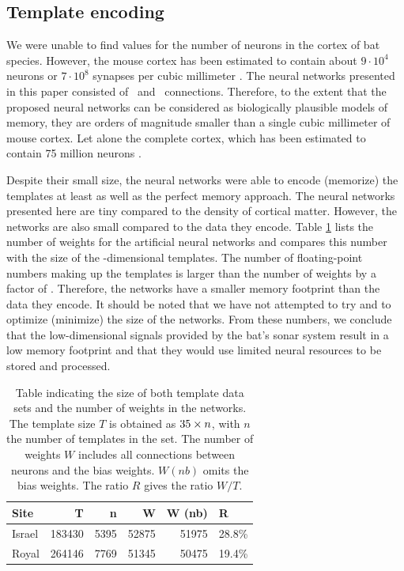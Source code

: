 \documentclass[preprint,5p]{elsarticle}
\begin{document}
\subsection{Template encoding}

We were unable to find values for the number of neurons in the cortex of bat species. However, the mouse cortex has been estimated to contain about $9 \cdot 10^4$ neurons or $7 \cdot 10^8$ synapses per cubic millimeter \citep{Braitenberg2013}. The neural networks presented in this paper consisted of \nneurons\ and \nweights\ connections. Therefore, to the extent that the proposed neural networks can be considered as biologically plausible models of memory, they are orders of magnitude smaller than a single cubic millimeter of mouse cortex. Let alone the complete cortex, which has been estimated to contain 75 million neurons \citep{Williams2000}. 

Despite their small size, the neural networks were able to encode (memorize) the templates at least as well as the perfect memory approach. The neural networks presented here are tiny compared to the density of cortical matter. However, the networks are also small compared to the data they encode. Table \ref{tab:sizes} lists the number of weights for the artificial neural networks and compares this number with the size of the \pca-dimensional templates. The number of floating-point numbers making up the templates is larger than the number of weights by a factor of \Compression. Therefore, the networks have a smaller memory footprint than the data they encode. It should be noted that we have not attempted to try and to optimize (minimize) the size of the networks. From these numbers, we conclude that the low-dimensional signals provided by the bat's sonar system result in a low memory footprint and that they would use limited neural resources to be stored and processed.

\begin{table}
	\centering
	\begin{tabular}{lrrrrl}
		\toprule
		Site &       T &     n &      W &  W (nb) &      R \\
		\midrule
		Israel &  183430 &  5395 &  52875 &   51975 &  28.8\% \\
		Royal &  264146 &  7769 &  51345 &   50475 &  19.4\% \\
		\bottomrule
	\end{tabular}
	\label{tab:sizes}
	\caption{Table indicating the size of both template data sets and the number of weights in the networks. The template size $T$ is obtained as $35 \times n$, with $n$ the number of templates in the set. The number of weights $W$ includes all connections between neurons and the bias weights. $W (nb)$ omits the bias weights. The ratio $R$ gives the ratio $W/T$.}
\end{table}
\end{document}

